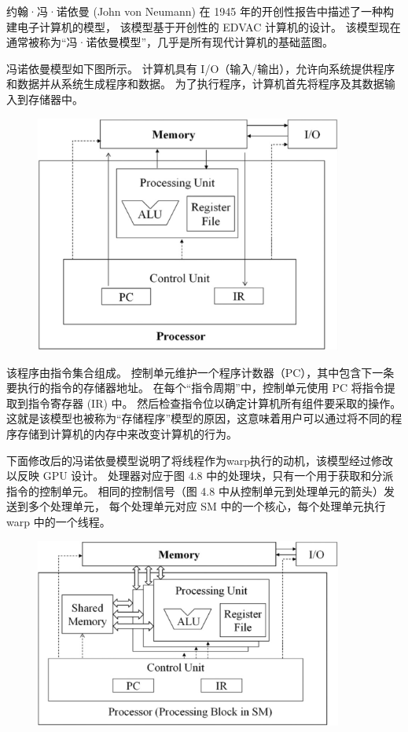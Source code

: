\begin{remark}[warp与SIMD硬件]
约翰·冯·诺依曼 (John von Neumann) 在 1945 年的开创性报告中描述了一种构建电子计算机的模型，
该模型基于开创性的 EDVAC 计算机的设计。 该模型现在通常被称为“冯·诺依曼模型”，几乎是所有现代计算机的基础蓝图。

冯诺依曼模型如下图所示。 计算机具有 I/O（输入/输出），允许向系统提供程序和数据并从系统生成程序和数据。 
为了执行程序，计算机首先将程序及其数据输入到存储器中。

\begin{figure}[H]
	\centering
	\includegraphics[width=0.9\textwidth]{figs/F4-a.1.png}
\end{figure}

该程序由指令集合组成。 控制单元维护一个程序计数器（PC），其中包含下一条要执行的指令的存储器地址。 
在每个“指令周期”中，控制单元使用 PC 将指令提取到指令寄存器 (IR) 中。 然后检查指令位以确定计算机所有组件要采取的操作。 
这就是该模型也被称为“存储程序”模型的原因，这意味着用户可以通过将不同的程序存储到计算机的内存中来改变计算机的行为。

下面修改后的冯诺依曼模型说明了将线程作为warp执行的动机，该模型经过修改以反映 GPU 设计。 
处理器对应于图 4.8 中的处理块，只有一个用于获取和分派指令的控制单元。 
相同的控制信号（图 4.8 中从控制单元到处理单元的箭头）发送到多个处理单元，
每个处理单元对应 SM 中的一个核心，每个处理单元执行 warp 中的一个线程。

\begin{figure}[H]
	\centering
	\includegraphics[width=0.9\textwidth]{figs/F4-a.2.png}
\end{figure}


\end{remark}

